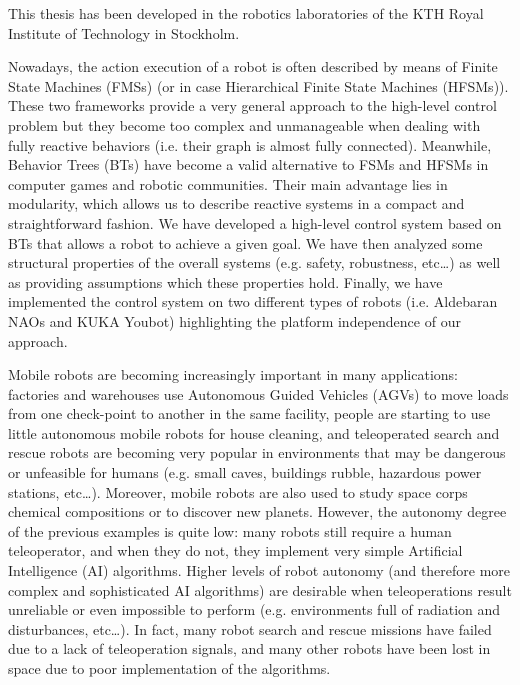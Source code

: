 \documentclass[12pt, a4paper]{article}
\begin{document}
This thesis has been developed in the robotics laboratories of the KTH Royal Institute of Technology in Stockholm. \par
Nowadays, the action execution of a robot is often described by means of Finite State Machines (FMSs) (or in case Hierarchical Finite State Machines (HFSMs)). These two frameworks provide a very general approach to the high-level control problem but they become too complex and unmanageable when dealing with fully reactive behaviors (i.e. their graph is almost fully connected). Meanwhile, Behavior Trees (BTs) have become a valid alternative to FSMs and HFSMs in computer games and robotic communities. Their main advantage lies in modularity, which allows us to describe reactive systems in a compact and straightforward fashion. We have developed a high-level control system based on BTs that allows a robot to achieve a given goal. We have then analyzed some structural properties of the overall systems (e.g. safety, robustness, etc\dots) as well as providing assumptions which these properties hold. Finally, we have implemented the control system on two different types of robots (i.e. Aldebaran NAOs and KUKA Youbot) highlighting the platform independence of our approach. \par
Mobile robots are becoming increasingly important in many applications: factories and warehouses use Autonomous Guided Vehicles (AGVs) to move loads from one check-point to another in the same facility, people are starting to use little autonomous mobile robots for house cleaning, and teleoperated search and rescue robots are becoming very popular in environments that may be dangerous or unfeasible for humans (e.g. small caves, buildings rubble, hazardous power stations, etc\dots). Moreover, mobile robots are also used to study space corps chemical compositions or to discover new planets. However, the autonomy degree of the previous examples is quite low: many robots still require a human teleoperator, and when they do not, they implement very simple Artificial Intelligence (AI) algorithms.
Higher levels of robot autonomy (and therefore more complex and sophisticated AI algorithms) are desirable when teleoperations result unreliable or even impossible to perform (e.g. environments full of radiation and disturbances, etc\dots). In fact, many robot search and rescue missions have failed due to a lack of teleoperation signals, and many other robots have been lost in space due to poor implementation of the algorithms. \par
\end{document}
